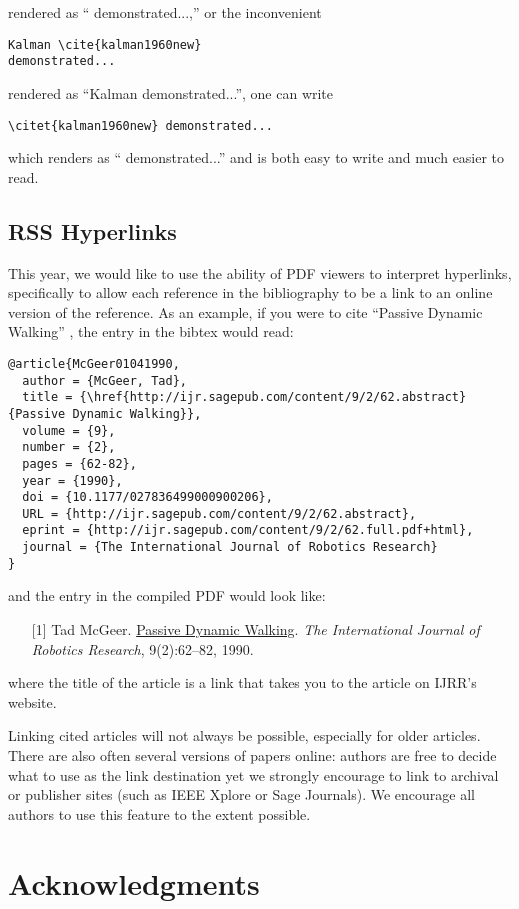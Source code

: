 \documentclass[conference]{IEEEtran}
\begin{document}
\noindent
rendered as ``\cite{kalman1960new} demonstrated...,''
or the
inconvenient 

{\small
\begin{verbatim}
Kalman \cite{kalman1960new} 
demonstrated...
\end{verbatim}
}

\noindent
rendered as 
``Kalman \cite{kalman1960new} demonstrated...'', 
one can
write 

{\small
\begin{verbatim}
\citet{kalman1960new} demonstrated... 
\end{verbatim}
}
\noindent
which renders as ``\citet{kalman1960new} demonstrated...'' and is 
both easy to write and much easier to read.
  
\subsection{RSS Hyperlinks}

This year, we would like to use the ability of PDF viewers to interpret
hyperlinks, specifically to allow each reference in the bibliography to be a
link to an online version of the reference. 
As an example, if you were to cite ``Passive Dynamic Walking''
\cite{McGeer01041990}, the entry in the bibtex would read:

{\small
\begin{verbatim}
@article{McGeer01041990,
  author = {McGeer, Tad}, 
  title = {\href{http://ijr.sagepub.com/content/9/2/62.abstract}{Passive Dynamic Walking}}, 
  volume = {9}, 
  number = {2}, 
  pages = {62-82}, 
  year = {1990}, 
  doi = {10.1177/027836499000900206}, 
  URL = {http://ijr.sagepub.com/content/9/2/62.abstract}, 
  eprint = {http://ijr.sagepub.com/content/9/2/62.full.pdf+html}, 
  journal = {The International Journal of Robotics Research}
}
\end{verbatim}
}
\noindent
and the entry in the compiled PDF would look like:

\def\tmplabel#1{[#1]}

\begin{enumerate}
\item[\tmplabel{1}] Tad McGeer. \href{http://ijr.sagepub.com/content/9/2/62.abstract}{Passive Dynamic
Walking}. {\em The International Journal of Robotics Research}, 9(2):62--82,
1990.
\end{enumerate}
%
where the title of the article is a link that takes you to the article on IJRR's website. 


Linking cited articles will not always be possible, especially for
older articles. There are also often several versions of papers
online: authors are free to decide what to use as the link destination
yet we strongly encourage to link to archival or publisher sites
(such as IEEE Xplore or Sage Journals).  We encourage all authors to use this feature to
the extent possible.



\section*{Acknowledgments}




\end{document}
